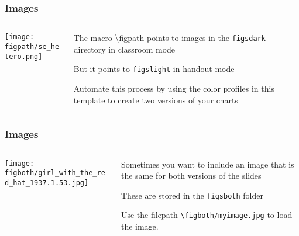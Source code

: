 \documentclass[aspectratio=169,handout]{beamer}
\begin{document}
\begin{frame}
	\frametitle{Images}
	\begin{columns}[T] %
	\begin{column}{.48\textwidth}
		\texttt{[image: \\figpath/se\_hetero.png]}
	\end{column}%
	\hfill%
	\begin{column}{.48\textwidth}
		\begin{witem}
		\item The macro {\textbackslash{}figpath} points to images in the
			\texttt{figs\textunderscore{}dark} directory in classroom mode
		\item But it points to \texttt{figs\textunderscore{}light} in handout mode
		\item Automate this process by using the color profiles in this template
			to create two versions of your charts
	\end{witem}
	\end{column}%
	\end{columns}
\end{frame}





\begin{frame}
	\frametitle{Images}
	\begin{columns}[T] %
	\begin{column}{.48\textwidth}
		\texttt{[image: \\figboth/girl\_with\_the\_red\_hat\_1937.1.53.jpg]}
	\end{column}%
	\hfill%
	\begin{column}{.48\textwidth}
		\begin{witem}
		\item Sometimes you want to include an image that is the same for both versions
			of the slides
		\item These are stored in the \texttt{figs\textunderscore{}both} folder
		\item Use the filepath \texttt{\textbackslash{}figboth/myimage.jpg} to load the image.
	\end{witem}
	\end{column}%
	\end{columns}
\end{frame}
\end{document}
